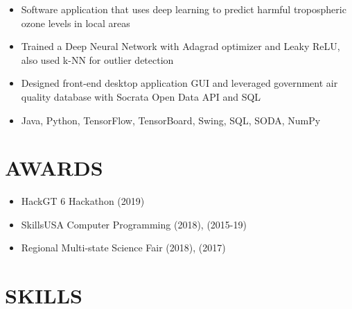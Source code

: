 \documentclass[11pt,letterpaper]{article}
\begin{document}
    \begin{itemize}
      \item{Software application that uses deep learning to predict harmful tropospheric ozone levels in local areas}
      
          \item{Trained a Deep Neural Network with Adagrad optimizer and Leaky ReLU, also used k-NN for outlier detection}
      
      \item{Designed front-end desktop application GUI and leveraged government air quality database with Socrata Open Data API and SQL}

      \item{
        {}
        Java, Python, TensorFlow, TensorBoard, Swing, SQL, SODA, NumPy
      }
    \end{itemize}
  \fi

  \bigskip

  
  \section*{AWARDS}

  \begin{itemize}
    \item{
      HackGT 6 Hackathon
      \textemdash{}
      {}
      (2019)
    }

    \item{
      SkillsUSA Computer Programming
      \textemdash{}
      {}
      (2018),
      {}
      (2015-19)
    }

    \item{
      Regional Multi-state Science Fair
      \textemdash{}
      {}
      (2018),
      {}
      (2017)
    }
  \end{itemize}

  \bigskip


  \section*{SKILLS}
\end{document}
